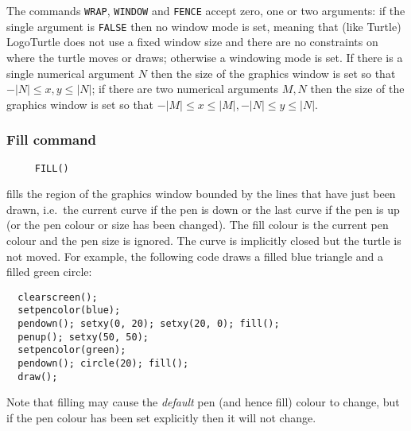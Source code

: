 The commands \texttt{WRAP}, \texttt{WINDOW} and \texttt{FENCE} accept
zero, one or two arguments: if the single argument is \texttt{FALSE}
then no window mode is set, meaning that (like Turtle) LogoTurtle does
not use a fixed window size and there are no constraints on where the
turtle moves or draws; otherwise a windowing mode is set.  If there is
a single numerical argument $N$ then the size of the graphics window
is set so that $-|N| \le x,y \le |N|$; if there are two numerical
arguments $M, N$ then the size of the graphics window is set so that
$-|M| \le x \le |M|, -|N| \le y \le |N|$.

\subsubsection*{Fill command}
\begin{verbatim}
     FILL()
\end{verbatim}
fills the region of the graphics window bounded by the lines that have
just been drawn, i.e.\ the current curve if the pen is down or the
last curve if the pen is up (or the pen colour or size has been
changed).  The fill colour is the current pen colour and the pen size
is ignored.  The curve is implicitly closed but the turtle is not
moved.  For example, the following code draws a filled blue triangle
and a filled green circle:
\begin{verbatim}
  clearscreen();
  setpencolor(blue);
  pendown(); setxy(0, 20); setxy(20, 0); fill();
  penup(); setxy(50, 50);
  setpencolor(green);
  pendown(); circle(20); fill();
  draw();
\end{verbatim}
Note that filling may cause the \emph{default} pen (and hence fill)
colour to change, but if the pen colour has been set explicitly then
it will not change.

